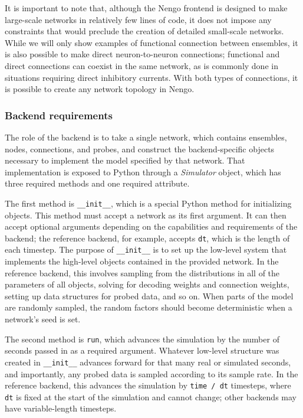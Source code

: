 \documentclass{frontiersSCNS}
\begin{document}
It is important to note that,
although the Nengo frontend
is designed to make large-scale networks
in relatively few lines of code,
it does not impose any constraints
that would preclude
the creation
of detailed small-scale networks.
While we will only show examples
of functional connection between ensembles,
it is also possible
to make direct neuron-to-neuron connections;
functional and direct connections
can coexist in the same network,
as is commonly done in situations
requiring direct inhibitory currents.
With both types of connections,
it is possible to create
any network topology in Nengo.

\subsubsection{Backend requirements}
\label{Sec:Backend}

The role of the backend is to take
a single network, which contains
ensembles, nodes, connections, and probes,
and construct the backend-specific objects necessary
to implement the model specified by that network.
That implementation is exposed to Python
through a \textit{Simulator} object,
which has three required methods
and one required attribute.

The first method is \texttt{\_\_init\_\_},
which is a special Python method for initializing objects.
This method must accept a network as its first argument.
It can then accept optional arguments depending on
the capabilities and requirements of the backend;
the reference backend, for example,
accepts \texttt{dt},
which is the length of each timestep.
The purpose of \texttt{\_\_init\_\_} is to
set up the low-level system
that implements the high-level objects
contained in the provided network.
In the reference backend,
this involves sampling from the distributions
in all of the parameters of all objects,
solving for decoding weights and connection weights,
setting up data structures for probed data,
and so on.
When parts of the model are randomly sampled,
the random factors should become deterministic
when a network's seed is set.

The second method is \texttt{run},
which advances the simulation
by the number of seconds
passed in as a required argument.
Whatever low-level structure was created
in \texttt{\_\_init\_\_} advances forward
for that many real or simulated seconds,
and importantly, any probed data is sampled
according to its sample rate.
In the reference backend,
this advances the simulation
by \texttt{time / dt} timesteps,
where \texttt{dt} is fixed at the start of the simulation
and cannot change;
other backends may have variable-length timesteps.
\end{document}
